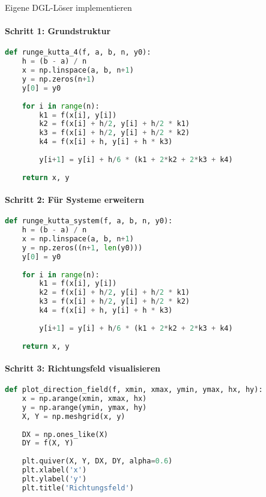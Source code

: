 \begin{KR}{Eigene DGL-Löser implementieren}\\
\paragraph{Schritt 1: Grundstruktur}
\begin{lstlisting}[language=Python, style=basesmol]
def runge_kutta_4(f, a, b, n, y0):
    h = (b - a) / n
    x = np.linspace(a, b, n+1)
    y = np.zeros(n+1)
    y[0] = y0
    
    for i in range(n):
        k1 = f(x[i], y[i])
        k2 = f(x[i] + h/2, y[i] + h/2 * k1)
        k3 = f(x[i] + h/2, y[i] + h/2 * k2)
        k4 = f(x[i] + h, y[i] + h * k3)
        
        y[i+1] = y[i] + h/6 * (k1 + 2*k2 + 2*k3 + k4)
    
    return x, y
\end{lstlisting}

\paragraph{Schritt 2: Für Systeme erweitern}
\begin{lstlisting}[language=Python, style=basesmol]
def runge_kutta_system(f, a, b, n, y0):
    h = (b - a) / n
    x = np.linspace(a, b, n+1)
    y = np.zeros((n+1, len(y0)))
    y[0] = y0
    
    for i in range(n):
        k1 = f(x[i], y[i])
        k2 = f(x[i] + h/2, y[i] + h/2 * k1)
        k3 = f(x[i] + h/2, y[i] + h/2 * k2)
        k4 = f(x[i] + h, y[i] + h * k3)
        
        y[i+1] = y[i] + h/6 * (k1 + 2*k2 + 2*k3 + k4)
    
    return x, y
\end{lstlisting}

\paragraph{Schritt 3: Richtungsfeld visualisieren}
\begin{lstlisting}[language=Python, style=basesmol]
def plot_direction_field(f, xmin, xmax, ymin, ymax, hx, hy):
    x = np.arange(xmin, xmax, hx)
    y = np.arange(ymin, ymax, hy)
    X, Y = np.meshgrid(x, y)
    
    DX = np.ones_like(X)
    DY = f(X, Y)
    
    plt.quiver(X, Y, DX, DY, alpha=0.6)
    plt.xlabel('x')
    plt.ylabel('y')
    plt.title('Richtungsfeld')
\end{lstlisting}
\end{KR}


